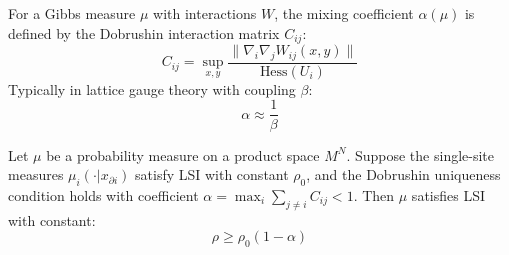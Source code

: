 \begin{definition}
For a Gibbs measure $\mu$ with interactions $W$, the mixing coefficient $\alpha(\mu)$ is defined by the Dobrushin interaction matrix $C_{ij}$:
\[ C_{ij} = \sup_{x,y} \frac{\| \nabla_i \nabla_j W_{ij}(x,y) \|}{\text{Hess}(U_i)} \]
Typically in lattice gauge theory with coupling $\beta$:
\[ \alpha \approx \frac{1}{\beta} \]
\end{definition}

\begin{theorem}
Let $\mu$ be a probability measure on a product space $M^N$. Suppose the single-site measures $\mu_i(\cdot | x_{\partial i})$ satisfy LSI with constant $\rho_0$, and the Dobrushin uniqueness condition holds with coefficient $\alpha = \max_i \sum_{j \neq i} C_{ij} < 1$.
Then $\mu$ satisfies LSI with constant:
\[
\rho \ge \rho_0 (1 - \alpha)
\]
\end{theorem}

